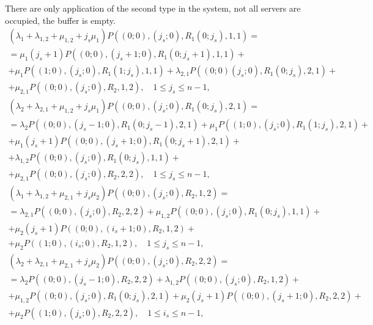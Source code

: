 {There are only application of the second type in the system, not all
servers are occupied, the buffer is empty.
\begin{multline}
  \left(\lambda_1+\lambda_{1,2}+\mu_{1,2}+j_s\mu_1\right)
  P\left((0;0),(j_s;0),R_1(0;j_s),1,1\right)=\\ = \mu_1 (j_s+1)
  P\left((0;0),(j_s+1;0),R_1(0;j_s+1),1,1\right) + \\ + \mu_1
  P\left((1;0),(j_s;0),R_1(1;j_s),1,1\right) + \lambda_{2,1}
  P\left((0;0)(j_s;0),R_1(0;j_s),2,1\right) + \\ +\mu_{2,1}
  P\left((0;0),(j_s;0),R_2,1,2\right), \quad 1\leqslant j_s\leqslant
  n-1,
\label{eq:5.1}
\end{multline}
\begin{multline}
  \left(\lambda_2+\lambda_{2,1}+\mu_{1,2}+j_s\mu_1\right)
  P\left((0;0),(j_s;0),R_1(0;j_s),2,1\right)=\\ = \lambda_2
  P\left((0;0),(j_s-1;0),R_1(0;j_s-1),2,1\right) + \mu_1
  P\left((1;0),(j_s;0),R_1(1;j_s),2,1\right)+\\ + \mu_1 (j_s+1)
  P\left((0;0),(j_s+1;0),R_1(0;j_s+1),2,1\right) +\\ + \lambda_{1,2}
  P\left((0;0),(j_s;0),R_1(0;j_s),1,1\right) + \\ + \mu_{2,1}
  P\left((0;0),(j_s;0),R_2,2,2\right), \quad 1\leqslant j_s\leqslant
  n-1,
\label{eq:5.2}
\end{multline}
\begin{multline}
  \left(\lambda_1+\lambda_{1,2}+\mu_{2,1}+j_s\mu_2\right)
  P\left((0;0),(j_s;0),R_2,1,2\right)= \\ = \lambda_{2,1}
  P\left((0;0),(j_s;0),R_2,2,2\right) + \mu_{1,2}
  P\left((0;0),(j_s;0),R_1(0;j_s),1,1\right)+\\ + \mu_2 (j_s+1)
  P\left((0;0),(i_s+1;0),R_2,1,2\right) + \\ +\mu_2
  P\left((1;0),(i_s;0),R_2,1,2\right),\quad 1\leqslant j_s\leqslant
  n-1,
\label{eq:5.3}
\end{multline}
\begin{multline}
  \left(\lambda_2+\lambda_{2,1}+\mu_{2,1}+j_s\mu_2\right)
  P\left((0;0),(j_s;0),R_2,2,2\right)=\\ = \lambda_2
  P\left((0;0),(j_s-1;0),R_2,2,2\right) + \lambda_{1,2}
  P\left((0;0),(j_s;0),R_2,1,2\right) + \\ + \mu_{1,2}
  P\left((0;0),(j_s;0),R_1(0;j_s),2,1\right)+ \mu_2 (j_s+1)
  P\left((0;0),(j_s+1;0),R_2,2,2\right) + \\ + \mu_2
  P\left((1;0),(j_s;0),R_2,2,2\right), \quad 1\leqslant i_s\leqslant
  n-1,
\label{eq:5.4}
\end{multline}

}

